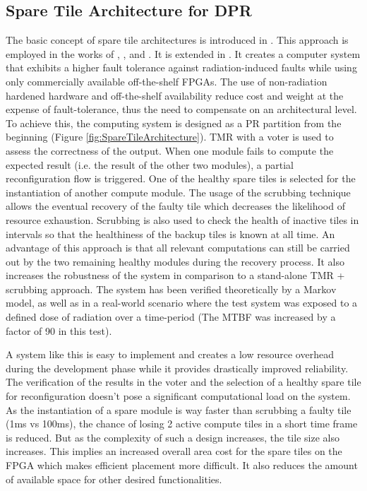 \subsection{Spare Tile Architecture for \gls{DPR}}\label{sec:SpareTileArchitecture}
The basic concept of spare tile architectures is introduced in \cite{bolchini2007}. 
This approach is employed in the works of \cite{davis2014}, \cite{kastil2012}, \cite{zhang2013} and \cite{lameres_radsat_2015}. 
It is extended in \cite{wilson_hybrid_2017}.
It creates a computer system that exhibits a higher fault tolerance against radiation-induced faults while using only commercially available off-the-shelf \glspl{FPGA}.
The use of non-radiation hardened hardware and off-the-shelf availability reduce cost and weight at the expense of fault-tolerance, thus the need to compensate on an architectural level. 
To achieve this, the computing system is designed as a \gls{PR} partition from the beginning (Figure \ref{fig:SpareTileArchitecture}). 
\gls{TMR} with a voter is used to assess the correctness of the output. 
When one module fails to compute the expected result (i.e. the result of the other two modules), a partial reconfiguration flow is triggered.
One of the healthy spare tiles is selected for the instantiation of another compute module.
The usage of the scrubbing technique allows the eventual recovery of the faulty tile which decreases the likelihood of resource exhaustion. 
Scrubbing is also used to check the health of inactive tiles in intervals so that the healthiness of the backup tiles is known at all time. 
An advantage of this approach is that all relevant computations can still be carried out by the two remaining healthy modules during the recovery process. 
It also increases the robustness of the system in comparison to a stand-alone \gls{TMR} + scrubbing approach.
The system has been verified theoretically by a Markov model, as well as in a real-world scenario where the test system was exposed to a defined dose of radiation over a time-period (The \gls{MTBF} was increased by a factor of 90 in this test).

A system like this is easy to implement and creates a low resource overhead during the development phase while it provides drastically improved reliability.
The verification of the results in the voter and the selection of a healthy spare tile for reconfiguration doesn't pose a significant computational load on the system.
As the instantiation of a spare module is way faster than scrubbing a faulty tile (1ms vs 100ms), the chance of losing 2 active compute tiles in a short time frame is reduced. 
But as the complexity of such a design increases, the tile size also increases. 
This implies an increased overall area cost for the spare tiles on the \gls{FPGA} which makes efficient placement more difficult.
It also reduces the amount of available space for other desired functionalities. 


